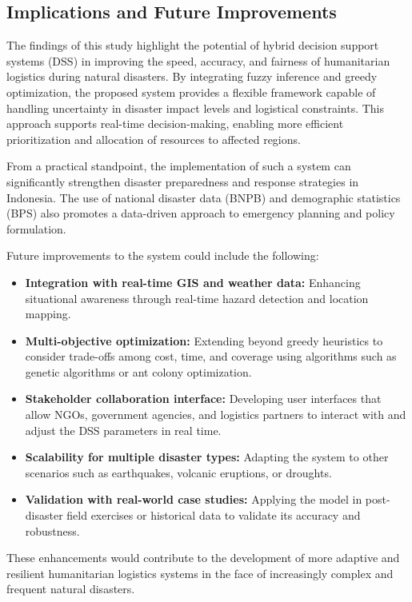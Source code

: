 \documentclass[journal,final,a4paper,twoside,11pt]{IEEEtran}
\begin{document}
\subsection{Implications and Future Improvements}

The findings of this study highlight the potential of hybrid decision support systems (DSS) in improving the speed, accuracy, and fairness of humanitarian logistics during natural disasters. By integrating fuzzy inference and greedy optimization, the proposed system provides a flexible framework capable of handling uncertainty in disaster impact levels and logistical constraints. This approach supports real-time decision-making, enabling more efficient prioritization and allocation of resources to affected regions.

From a practical standpoint, the implementation of such a system can significantly strengthen disaster preparedness and response strategies in Indonesia. The use of national disaster data (BNPB) and demographic statistics (BPS) also promotes a data-driven approach to emergency planning and policy formulation.

Future improvements to the system could include the following:

\begin{itemize}
    \item \textbf{Integration with real-time GIS and weather data:} Enhancing situational awareness through real-time hazard detection and location mapping.
    \item \textbf{Multi-objective optimization:} Extending beyond greedy heuristics to consider trade-offs among cost, time, and coverage using algorithms such as genetic algorithms or ant colony optimization.
    \item \textbf{Stakeholder collaboration interface:} Developing user interfaces that allow NGOs, government agencies, and logistics partners to interact with and adjust the DSS parameters in real time.
    \item \textbf{Scalability for multiple disaster types:} Adapting the system to other scenarios such as earthquakes, volcanic eruptions, or droughts.
    \item \textbf{Validation with real-world case studies:} Applying the model in post-disaster field exercises or historical data to validate its accuracy and robustness.
\end{itemize}

These enhancements would contribute to the development of more adaptive and resilient humanitarian logistics systems in the face of increasingly complex and frequent natural disasters.
\end{document}
